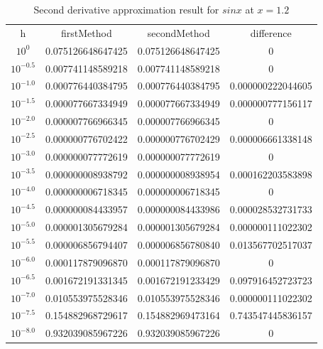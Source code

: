 \documentclass{article}
\begin{document}
  \begin{longtable}{c|c|c|c}
	\caption{Second derivative approximation result for $sinx$ at $x=1.2$} \\
  \hline\hline
	  h & firstMethod & secondMethod & difference \\ [0.5ex]
  
$10^{0}$ & 0.075126648647425 & 0.075126648647425 & 0 \\
$10^{-0.5}$ & 0.007741148589218 & 0.007741148589218 & 0 \\
$10^{-1.0}$ & 0.000776440384795 & 0.000776440384795 & 0.000000222044605 \\
$10^{-1.5}$ & 0.000077667334949 & 0.000077667334949 & 0.000000777156117 \\
$10^{-2.0}$ & 0.000007766966345 & 0.000007766966345 & 0                 \\
$10^{-2.5}$ & 0.000000776702422 & 0.000000776702429 & 0.000006661338148 \\
$10^{-3.0}$ & 0.000000077772619 & 0.000000077772619 & 0                 \\
$10^{-3.5}$ & 0.000000008938792 & 0.000000008938954 & 0.000162203583898 \\
$10^{-4.0}$ & 0.000000006718345 & 0.000000006718345 & 0                 \\
$10^{-4.5}$ & 0.000000084433957 & 0.000000084433986 & 0.000028532731733 \\
$10^{-5.0}$ & 0.000001305679284 & 0.000001305679284 & 0.000000111022302 \\
$10^{-5.5}$ & 0.000006856794407 & 0.000006856780840 & 0.013567702517037 \\
$10^{-6.0}$ & 0.000117879096870 & 0.000117879096870 & 0                 \\
$10^{-6.5}$ & 0.001672191331345 & 0.001672191233429 & 0.097916452723723 \\
$10^{-7.0}$ & 0.010553975528346 & 0.010553975528346 & 0.000000111022302 \\
$10^{-7.5}$ & 0.154882968729617 & 0.154882969473164 & 0.743547445836157 \\
	  $10^{-8.0}$ & 0.932039085967226 & 0.932039085967226 & 0 \\ [1ex]
	  
	  
	  
	  
	  
	  
	  
	  
	  
	  
	  
	  
	  
	  
   \hline

  \end{longtable}
	  
\end{document}
